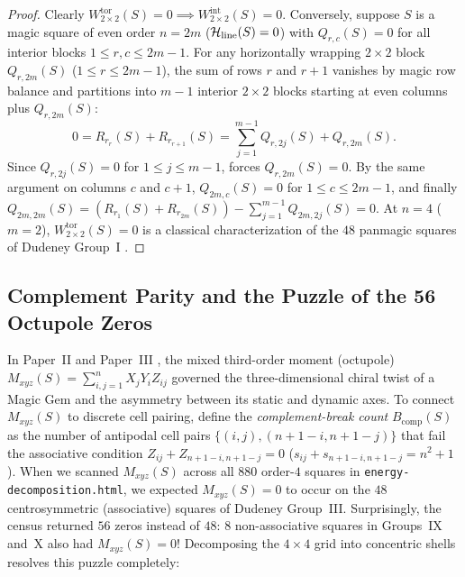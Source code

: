 \begin{proof}
Clearly $W_{2\times 2}^{\mathrm{tor}}(S) = 0 \implies W_{2\times 2}^{\mathrm{int}}(S) = 0$. Conversely, suppose $S$ is a magic square of even order $n = 2m$ ($\mathcal{H}_{\mathrm{line}}(S) = 0$) with $Q_{r,c}(S) = 0$ for all interior blocks $1 \le r,c \le 2m-1$. For any horizontally wrapping $2\times 2$ block $Q_{r,2m}(S)$ ($1 \le r \le 2m-1$), the sum of rows $r$ and $r+1$ vanishes by magic row balance and partitions into $m-1$ interior $2\times 2$ blocks starting at even columns plus $Q_{r,2m}(S)$:
\begin{equation}
  0 = R_{r_r}(S) + R_{r_{r+1}}(S) = \sum_{j=1}^{m-1} Q_{r,2j}(S) + Q_{r,2m}(S).
  \label{eq:row_pair_partition}
\end{equation}
Since $Q_{r,2j}(S) = 0$ for $1 \le j \le m-1$,  forces $Q_{r,2m}(S) = 0$. By the same argument on columns $c$ and $c+1$, $Q_{2m,c}(S) = 0$ for $1 \le c \le 2m-1$, and finally $Q_{2m,2m}(S) = (R_{r_1}(S) + R_{r_{2m}}(S)) - \sum_{j=1}^{m-1} Q_{2m,2j}(S) = 0$. At $n=4$ ($m=2$), $W_{2\times 2}^{\mathrm{tor}}(S) = 0$ is a classical characterization of the $48$ panmagic squares of Dudeney Group~I \cite{dudeney1917amusements,ollerenshaw1998most}.
\end{proof}

\subsection{Complement Parity and the Puzzle of the 56 Octupole Zeros}

In Paper~II \cite{mathewson2026moments} and Paper~III \cite{mathewson2026mechanics}, the mixed third-order moment (octupole) $M_{xyz}(S) = \sum_{i,j=1}^n X_j Y_i Z_{ij}$ governed the three-dimensional chiral twist of a Magic Gem and the asymmetry between its static and dynamic axes. To connect $M_{xyz}(S)$ to discrete cell pairing, define the \emph{complement-break count} $B_{\mathrm{comp}}(S)$ as the number of antipodal cell pairs $\{(i,j), (n+1-i, n+1-j)\}$ that fail the associative condition $Z_{ij} + Z_{n+1-i, n+1-j} = 0$ ($s_{ij} + s_{n+1-i, n+1-j} = n^2+1$). When we scanned $M_{xyz}(S)$ across all $880$ order-$4$ squares in \texttt{energy-decomposition.html}, we expected $M_{xyz}(S) = 0$ to occur on the $48$ centrosymmetric (associative) squares of Dudeney Group~III. Surprisingly, the census returned $56$ zeros instead of $48$: $8$ non-associative squares in Groups~IX and~X also had $M_{xyz}(S) = 0$! Decomposing the $4\times 4$ grid into concentric shells resolves this puzzle completely:

